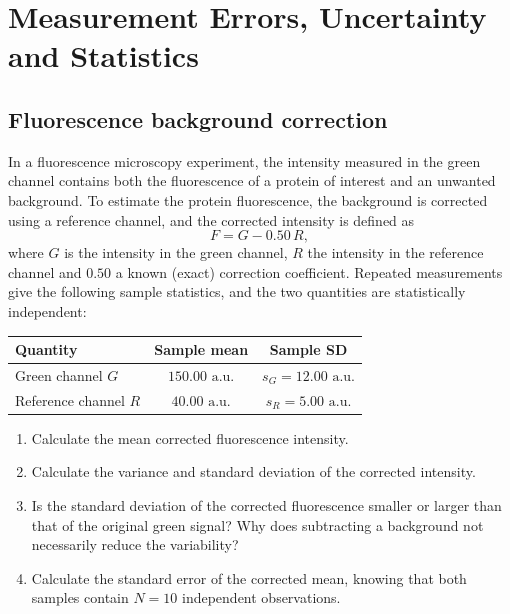 \section{Measurement Errors, Uncertainty and Statistics}
\label{app:ex_ch4}

\subsection{Fluorescence background correction}
\label{ex:background_correction}

In a fluorescence microscopy experiment, the intensity measured in the green channel contains both the fluorescence of a protein of interest and an unwanted background. To estimate the protein fluorescence, the background is corrected using a reference channel, and the corrected intensity is defined as
\begin{equation*}
F = G - 0.50\,R,
\end{equation*}
where $G$ is the intensity in the green channel, $R$ the intensity in the reference channel and $0.50$ a known (exact) correction coefficient. Repeated measurements give the following sample statistics, and the two quantities are statistically independent:
\begin{center}
\begin{tabular}{lcc}
\toprule
Quantity & Sample mean & Sample SD \\
\midrule
Green channel $G$ & $150.00\text{ a.u.}$ & $s_G = 12.00\text{ a.u.}$ \\
Reference channel $R$ & $40.00\text{ a.u.}$ & $s_R = 5.00\text{ a.u.}$ \\
\bottomrule
\end{tabular}
\end{center}
\begin{enumerate}[label=(\alph*)]
    \item Calculate the mean corrected fluorescence intensity.
    \item Calculate the variance and standard deviation of the corrected intensity.
    \item Is the standard deviation of the corrected fluorescence smaller or larger than that of the original green signal? Why does subtracting a background not necessarily reduce the variability?
    \item Calculate the standard error of the corrected mean, knowing that both samples contain $N = 10$ independent observations.
\end{enumerate}

